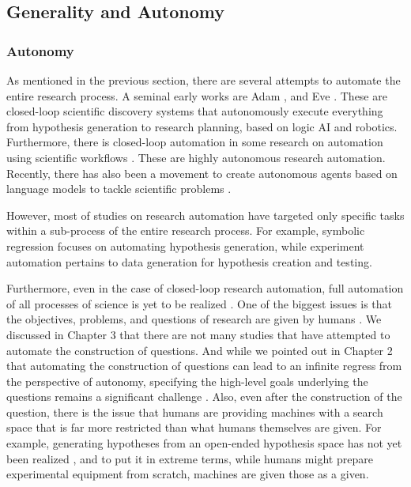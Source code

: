 \subsection{Generality and Autonomy}

\subsubsection{Autonomy}
As mentioned in the previous section, there are several attempts to automate the entire research process. A seminal early works are Adam \cite{king2004functional}, and Eve \cite{williams2015cheaper}. These are closed-loop scientific discovery systems that autonomously execute everything from hypothesis generation to research planning, based on logic AI and robotics. Furthermore, there is closed-loop automation in some research on automation using scientific workflows \cite{gil2017towards}. These are highly autonomous research automation. Recently, there has also been a movement to create autonomous agents based on language models to tackle scientific problems \cite{wang2023survey}.

However, most of studies on research automation have targeted  only specific tasks within a sub-process of the entire research process. For example, symbolic regression focuses on automating hypothesis generation, while experiment automation pertains to data generation for hypothesis creation and testing.

Furthermore, even in the case of closed-loop research automation,  full automation of all processes of science is yet to be realized \cite{zenil2023,coley2020autonomous,coley2020autonomousII}. One of the biggest issues is that the objectives, problems, and questions of research are given by humans \cite{coley2020autonomousII}. We discussed in Chapter 3 that there are not many studies that have attempted to automate the construction of questions. And while we pointed out in Chapter 2 that automating the construction of questions can lead to an infinite regress from the perspective of autonomy, specifying the high-level goals underlying the questions remains a significant challenge \cite{coley2020autonomousII}. Also, even after the construction of the question, there is the issue that humans are providing machines with a search space that is far more restricted than what humans themselves are given. For example, generating hypotheses from an open-ended hypothesis space has not yet been realized \cite{zenil2023,coley2020autonomousII}, and to put it in extreme terms, while humans might prepare experimental equipment from scratch, machines are given those as a given. 

